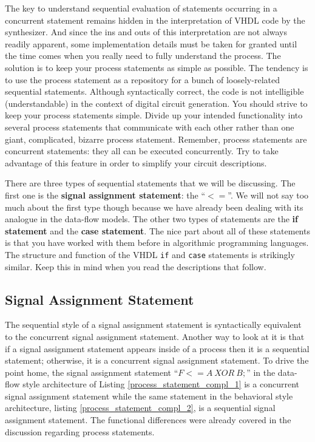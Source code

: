 The key to understand sequential evaluation of statements occurring in a concurrent statement remains hidden in the interpretation of VHDL code by the synthesizer. And since the ins and outs of this interpretation are not always readily apparent, some implementation details must be taken for granted until the time comes when you really need to fully understand the process. The solution is to keep your process statements as simple as possible. The tendency is to use the process statement as a repository for a bunch of loosely-related sequential statements. Although syntactically correct, the code is not intelligible (understandable) in the context of digital circuit generation. You should strive to keep your process statements simple. Divide up your intended functionality into several process statements that communicate with each other rather than one giant, complicated, bizarre process statement. Remember, process statements are concurrent statements: they all can be executed concurrently. Try to take advantage of this feature in order to simplify your circuit descriptions.

There are three types of sequential statements that we will be discussing. The first one is the \textbf{signal assignment statement}: 
the ``{\footnotesize$<=$}''. We will not say too much about the first type though because we have already been dealing with its analogue in the data-flow models. The other two types of statements are the \textbf{if statement} and the \textbf{case statement}. The nice part about all of these statements is that you have worked with them before in algorithmic programming languages. The structure and function of the VHDL \texttt{if} and \texttt{case} statements is strikingly similar. Keep this in mind when you read the descriptions that follow.

\subsection{Signal Assignment Statement}
The sequential style of a signal assignment statement is syntactically equivalent to the concurrent signal assignment statement. Another way to look at it is that if a signal assignment statement appears inside of a process then it is a sequential statement; otherwise, it is a concurrent signal assignment statement. To drive the point home, the signal assignment statement ``{\footnotesize$F <= A~XOR~B;$}'' in the data-flow style architecture of Listing \ref{process_statement_compl_1} is a concurrent signal assignment statement while the same statement in the behavioral style architecture, listing \ref{process_statement_compl_2}, is a sequential signal assignment statement. The functional differences were already covered in the discussion regarding process statements.

